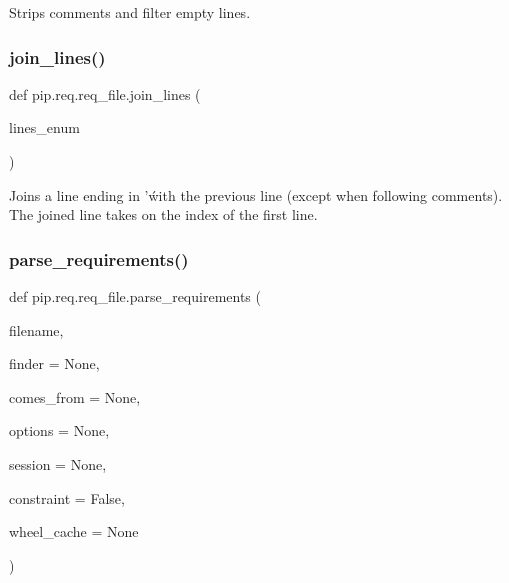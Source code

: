 \begin{DoxyVerb}Strips comments and filter empty lines.
\end{DoxyVerb}
 \mbox{\label{namespacepip_1_1req_1_1req__file_aea661e701d2523cfccf634f57ce1b5ff}} 
\subsubsection{\texorpdfstring{join\+\_\+lines()}{join\_lines()}}
{\footnotesize\ttfamily def pip.\+req.\+req\+\_\+file.\+join\+\_\+lines (\begin{DoxyParamCaption}\item[{}]{lines\+\_\+enum }\end{DoxyParamCaption})}

\begin{DoxyVerb}Joins a line ending in '\' with the previous line (except when following
comments).  The joined line takes on the index of the first line.
\end{DoxyVerb}
 \mbox{\label{namespacepip_1_1req_1_1req__file_a7600c5f923de1a1a46ad8541b9bd3084}} 
\subsubsection{\texorpdfstring{parse\+\_\+requirements()}{parse\_requirements()}}
{\footnotesize\ttfamily def pip.\+req.\+req\+\_\+file.\+parse\+\_\+requirements (\begin{DoxyParamCaption}\item[{}]{filename,  }\item[{}]{finder = {\ttfamily None},  }\item[{}]{comes\+\_\+from = {\ttfamily None},  }\item[{}]{options = {\ttfamily None},  }\item[{}]{session = {\ttfamily None},  }\item[{}]{constraint = {\ttfamily False},  }\item[{}]{wheel\+\_\+cache = {\ttfamily None} }\end{DoxyParamCaption})}

